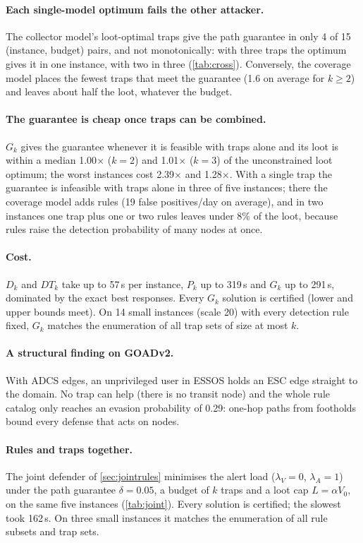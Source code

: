 \documentclass[10pt,twocolumn]{article}
\begin{document}
\paragraph{Each single-model optimum fails the other attacker.} The collector model's loot-optimal traps
give the path guarantee in only 4 of 15 (instance, budget) pairs, and not monotonically: with
three traps the optimum gives it in one instance, with two in three (\cref{tab:cross}).
Conversely, the coverage model places the fewest traps that meet the guarantee (1.6 on average for
$k\ge2$) and leaves about half the loot, whatever the budget.

\paragraph{The guarantee is cheap once traps can be combined.} $G_k$ gives the guarantee
whenever it is feasible with traps alone and its loot is within a median 1.00$\times$ ($k=2$)
and 1.01$\times$ ($k=3$) of the unconstrained loot optimum; the worst instances cost
2.39$\times$ and 1.28$\times$. With a single trap the guarantee is infeasible with traps alone in
three of five instances; there the coverage model adds rules (19 false positives/day on average), and in
two instances one trap plus one or two rules leaves under 8\% of the loot, because rules raise the
detection probability of many nodes at once.

\paragraph{Cost.} $D_k$ and $DT_k$ take up to 57\,s per instance, $P_k$ up to 319\,s and $G_k$
up to 291\,s, dominated by the exact best responses. Every $G_k$ solution is certified (lower and
upper bounds meet). On 14 small instances (scale 20) with every detection rule fixed, $G_k$
matches the enumeration of all trap sets of size at most $k$.

\paragraph{A structural finding on GOADv2.} With ADCS edges, an unprivileged user in ESSOS
holds an ESC edge straight to the domain. No trap can help (there is no transit node) and the
whole rule catalog only reaches an evasion probability of 0.29: one-hop paths from footholds
bound every defense that acts on nodes.

\paragraph{Rules and traps together.} The joint defender of \cref{sec:jointrules} minimises the
alert load ($\lambda_V=0$, $\lambda_A=1$) under the path guarantee $\delta=0.05$, a budget of $k$
traps and a loot cap $L=\alpha V_0$, on the same five instances (\cref{tab:joint}). Every solution
is certified; the slowest took 162\,s. On three small instances it matches the enumeration of all
rule subsets and trap sets.
\end{document}
